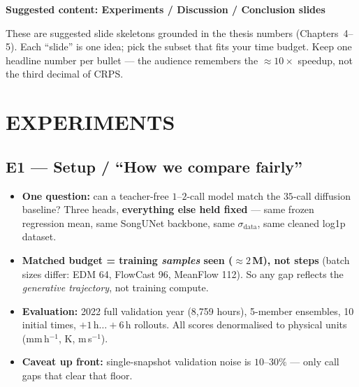 \documentclass[11pt]{article}
\begin{document}
\clearpage
\begin{center}
  \Large\textbf{Suggested content: Experiments / Discussion / Conclusion slides}
\end{center}
\vspace{0.5em}

\noindent These are suggested slide skeletons grounded in the thesis numbers
(Chapters~4--5). Each ``slide'' is one idea; pick the subset that fits your
time budget. Keep one headline number per bullet --- the audience remembers
the $\approx 10\times$ speedup, not the third decimal of CRPS.

\section*{EXPERIMENTS}

\subsection*{E1 --- Setup / ``How we compare fairly''}
\begin{itemize}
  \item \textbf{One question:} can a teacher-free $1$--$2$-call model match the
        $35$-call diffusion baseline? Three heads, \textbf{everything else held
        fixed} --- same frozen regression mean, same SongUNet backbone, same
        $\sigma_{\text{data}}$, same cleaned log1p dataset.
  \item \textbf{Matched budget = training \emph{samples} seen ($\approx 2$\,M),
        not steps} (batch sizes differ: EDM 64, FlowCast 96, MeanFlow 112). So
        any gap reflects the \emph{generative trajectory}, not training compute.
  \item \textbf{Evaluation:} 2022 full validation year (8{,}759 hours),
        5-member ensembles, 10 initial times, $+1$\,h$\ldots+6$\,h rollouts.
        All scores denormalised to physical units (mm\,h$^{-1}$, K, m\,s$^{-1}$).
  \item \textbf{Caveat up front:} single-snapshot validation noise is
        $10$--$30\%$ --- only call gaps that clear that floor.
\end{itemize}
\end{document}
